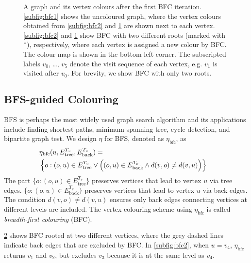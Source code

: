 \begin{figure}[t!]
\begin{subfigure}{.25\columnwidth}
\subcaption{}
\label{subfig:bfc3}
\end{subfigure}
\caption{
A graph and its vertex colours after the first BFC iteration. \ref{subfig:bfc1} shows the uncoloured graph, where the vertex colours obtained from \ref{subfig:bfc2} and  \ref{subfig:bfc3} are shown next to each vertex. 
\ref{subfig:bfc2} and \ref{subfig:bfc3} show BFC with two different roots (marked with *), respectively, where each vertex is assigned a new colour by BFC. The colour map is shown in the bottom left corner. The subscripted labels $v_0$, \dots, $v_5$ denote the visit sequence of each vertex, e.g. $v_1$ is visited after $v_0$.
For brevity, we show BFC with only two roots.} 
\label{fig:bfc}
\end{figure}

\subsection{BFS-guided Colouring}
BFS is perhaps the most widely used graph search algorithm and its applications include finding shortest paths, minimum spanning tree, cycle detection, and bipartite graph test. We design $\eta$ for BFS, denoted as $\eta_{\text{bfc}}$, as 
\begin{align}
\label{eqn:sigma_bf}
    &\eta_{\text{bfc}}(u, E_{\text{tree}}^{T_v}, E_{\text{back}}^{T_v}) =& \\
     &\left\{o: (o,u) \in E_{\text{tree}}^{T_v} \vee 
    \left((o, u) \in E_{\text{back}}^{T_v} \wedge
    d(v,o) \neq d(v,u)\right)
    \right\}& \notag
\end{align}
The part $\{o: (o,u) \in E_{\text{tree}}^{T_v}\}$ preserves vertices that lead to vertex $u$ via tree edges. $\{o: (o, u) \in E_{\text{back}}^{T_v}\}$ preserves vertices that lead to vertex $u$ via back edges. The condition $d(v,o) \neq d(v,u)$ ensures only back edges connecting vertices at different levels are included.
The vertex colouring scheme using $\eta_{\text{bfc}}$ is called \textit{breadth-first colouring} (BFC).

\cref{fig:bfc} shows BFC rooted at two different vertices, where the grey dashed lines indicate back edges that are excluded by BFC. In \cref{subfig:bfc2}, when $u = v_4$, $\eta_{\text{bfc}}$ returns $v_1$ and $v_2$, but excludes $v_3$ because it is at the same level as $v_4$. 

